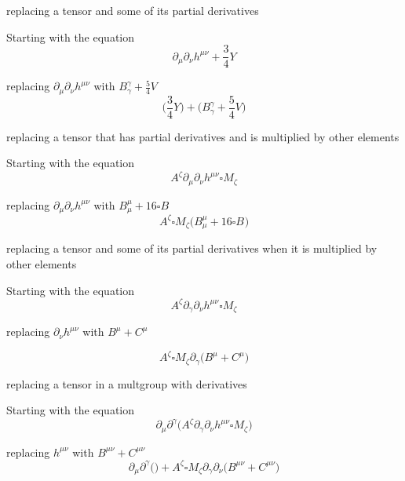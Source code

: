 \documentclass{article}
\def\){\Big)}
\def\({\Big(}
\begin{document}
\begin{itemize}
%
\item{replacing a tensor and some of its partial derivatives}



Starting with the equation
\begin{equation}
\partial_{\mu} \partial_{\nu} h^{\mu \nu} + \frac{3}{4} Y
\end{equation}

replacing $ \partial_{\mu} \partial_{\nu} h^{\mu \nu} $ with $ B^{\gamma}_{\gamma} + \frac{5}{4}V $
\begin{equation}
\(\frac{3}{4} Y \)+\( B_{\gamma}^{\gamma} +\frac{5}{4} V \)
\end{equation}

%
\item{replacing a tensor that has partial derivatives and is multiplied by other elements}

Starting with the equation
\begin{equation}
A^{\zeta} \partial_{\mu} \partial_{\nu} h^{\mu \nu} \square M_{\zeta}
\end{equation}

replacing $ \partial_{\mu} \partial_{\nu} h^{\mu \nu} $ with $ B^{\mu}_{\mu} + 16\square B^{} $
\begin{equation}
A^{\zeta} \square M_{\zeta} \( B_{\mu}^{\mu} +16 \square B^{} \)
\end{equation}

%
\item{ replacing a tensor and some of its partial derivatives when it is multiplied by other elements}

Starting with the equation
\begin{equation}
A^{\zeta} \partial_{\gamma} \partial_{\nu} h^{\mu \nu} \square M_{\zeta}
\end{equation}

replacing $ \partial_{\nu} h^{\mu \nu} $ with $ B^{\mu} + C^{\mu} $

\begin{equation}
A^{\zeta} \square M_{\zeta} \partial_{\gamma} \( B^{\mu} + C^{\mu} \)
\end{equation}


%
{\color{red}
\item{replacing a tensor in a multgroup with derivatives}

Starting with the equation
\begin{equation}
\partial_{\mu} \partial^{\gamma}\(A^{\zeta} \partial_{\gamma} \partial_{\nu} h^{\mu \nu} \square M_{\zeta}\)
\end{equation}

replacing $ h^{\mu \nu} $ with $ B^{\mu \nu} + C^{\mu \nu} $
\begin{equation}
\partial_{\mu} \partial^{\gamma} \(\)+ A^{\zeta} \square M_{\zeta} \partial_{\gamma} \partial_{\nu} \( B^{\mu \nu} + C^{\mu \nu} \)
\end{equation}

}
\end{itemize}
\end{document}
